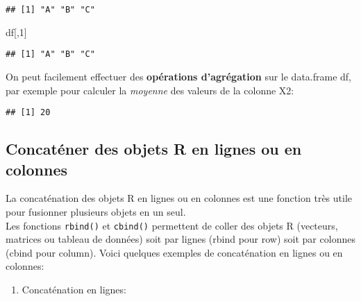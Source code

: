 \documentclass[
]{article}
\newenvironment{Shaded}{\begin{snugshade}}{\end{snugshade}}
\newcommand{\DecValTok}[1]{\textcolor[rgb]{0.00,0.00,0.81}{#1}}
\newcommand{\FunctionTok}[1]{\textcolor[rgb]{0.00,0.00,0.00}{#1}}
\newcommand{\NormalTok}[1]{#1}
\newcommand{\SpecialCharTok}[1]{\textcolor[rgb]{0.00,0.00,0.00}{#1}}
\providecommand{\tightlist}{%
  \setlength{\itemsep}{0pt}\setlength{\parskip}{0pt}}
\begin{document}
\begin{Shaded}
\end{Shaded}

\begin{verbatim}
## [1] "A" "B" "C"
\end{verbatim}

\begin{Shaded}
\begin{Highlighting}[]
\NormalTok{df[,}\DecValTok{1}\NormalTok{]}
\end{Highlighting}
\end{Shaded}

\begin{verbatim}
## [1] "A" "B" "C"
\end{verbatim}

On peut facilement effectuer des \textbf{opérations d'agrégation} sur le data.frame df, par exemple pour calculer la \emph{moyenne} des valeurs de la colonne X2:

\begin{Shaded}
\end{Shaded}

\begin{verbatim}
## [1] 20
\end{verbatim}

\hypertarget{concatuxe9ner-des-objets-r-en-lignes-ou-en-colonnes}{%
\subsection{Concaténer des objets R en lignes ou en colonnes}\label{concatuxe9ner-des-objets-r-en-lignes-ou-en-colonnes}}

La concaténation des objets R en lignes ou en colonnes est une fonction très utile pour fusionner plusieurs objets en un seul.\\
Les fonctions \texttt{rbind()} et \texttt{cbind()} permettent de coller des objets R (vecteurs, matrices ou
tableau de données) soit par lignes (rbind pour row) soit par colonnes (cbind pour column).
Voici quelques exemples de concaténation en lignes ou en colonnes:

\begin{enumerate}
\def\labelenumi{\arabic{enumi}.}
\tightlist
\item
  Concaténation en lignes:
\end{enumerate}
\end{document}
